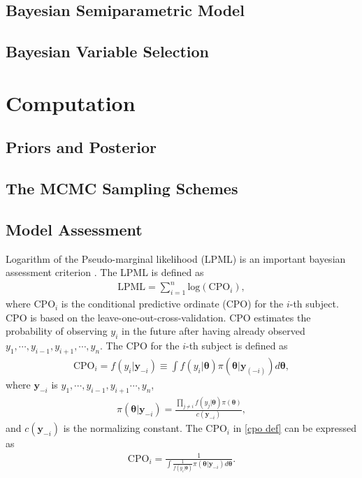 \documentclass[12pt]{article}
\begin{document}
\subsection{Bayesian Semiparametric Model}
\subsection{Bayesian Variable Selection}
\section{Computation}\label{sec:bayes_comp}
\subsection{Priors and Posterior}
\subsection{The MCMC Sampling Schemes}
\subsection{Model Assessment}
Logarithm of the Pseudo-marginal likelihood (LPML) is an important bayesian assessment criterion \cite{gelfand1994bayesian}. The LPML is defined as
\begin{align}
\label{eq:defLPML}
\text{LPML} = \sum_{i=1}^{n} \text{log}(\text{CPO}_i),
\end{align}
where $\text{CPO}_i$ is the conditional predictive ordinate (CPO) for the $i$-th subject. CPO is based on the leave-one-out-cross-validation. CPO estimates the probability of observing $y_i$ in the future
after having already observed $y_1,\cdots,y_{i-1},y_{i+1},\cdots,y_n$. The CPO for the $i$-th subject is defined as
\begin{align}
	\text{CPO}_i=f(y_i|\bm{y}_{-i}) \equiv \int f(y_i|\bm{\theta})\pi(\bm{\theta}|\bm{y}_{(-i)})d\bm{\theta},
	\label{cpo def}
\end{align}
where $\bm{y}_{-i}$ is $y_1,\cdots,y_{i-1},y_{i+1}\cdots,y_n$,
\begin{align}
	\pi(\bm{\theta}|\bm{y}_{-i})=\frac{\prod_{j\neq i}f(y_j|\bm{\theta})\pi(\bm{\theta})}{c(\bm{y}_{-i})},
\end{align}
and $c(\bm{y}_{-i})$ is the normalizing constant.
The $\text{CPO}_i$ in \eqref{cpo def} can be expressed as
\begin{align}
	\text{CPO}_i=\frac{1}{\int\frac{1}{f(y_i|\bm{\theta})}\pi(\bm{\theta}|\bm{y}_{-i})d\bm{\theta}}.
	\label{CPO1}
\end{align}
\end{document}
